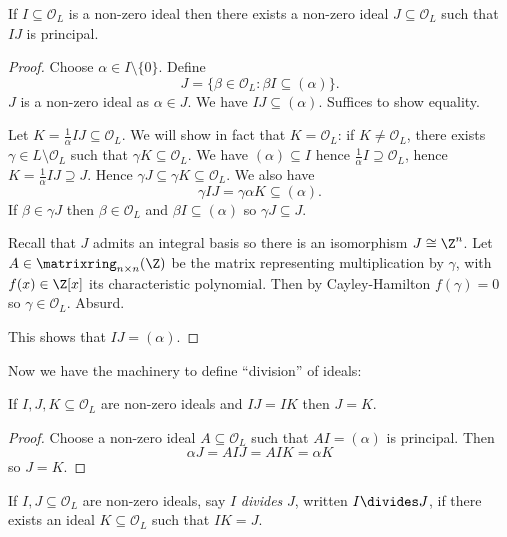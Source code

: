 \documentclass[a4paper]{article}
\renewcommand*{\O}{\mathcal{O}}
\begin{document}
\begin{proposition}
  If \(I \subseteq \O_L\) is a non-zero ideal then there exists a non-zero ideal \(J \subseteq \O_L\) such that \(IJ\) is principal.
\end{proposition}

\begin{proof}
  Choose \(\alpha \in I \setminus \{0\}\). Define
  \[
    J = \{\beta \in \O_L: \beta I \subseteq (\alpha)\}.
  \]
  \(J\) is a non-zero ideal as \(\alpha \in J\). We have \(IJ \subseteq (\alpha)\). Suffices to show equality.

  Let \(K = \frac{1}{\alpha}IJ \subseteq \O_L\). We will show in fact that \(K = \O_L\): if \(K \neq \O_L\), there exists \(\gamma \in L \setminus \O_L\) such that \(\gamma K \subseteq \O_L\). We have \((\alpha) \subseteq I\) hence \(\frac{1}{\alpha} I \supseteq \O_L\), hence \(K = \frac{1}{\alpha}IJ \supseteq J\). Hence \(\gamma J \subseteq \gamma K \subseteq \O_L\). We also have
  \[
    \gamma IJ = \gamma \alpha K \subseteq (\alpha).
  \]
  If \(\beta \in \gamma J\) then \(\beta \in \O_L\) and \(\beta I \subseteq (\alpha)\) so \(\gamma J \subseteq J\).

  Recall that \(J\) admits an integral basis so there is an isomorphism \(J \cong \Z^n\). Let \(A \in \matrixring_{n \times n}(\Z)\) be the matrix representing multiplication by \(\gamma\), with \(f(x) \in \Z[x]\) its characteristic polynomial. Then by Cayley-Hamilton \(f(\gamma) = 0\) so \(\gamma \in \O_L\). Absurd.

  This shows that \(IJ = (\alpha)\).
\end{proof}

Now we have the machinery to define ``division'' of ideals:

\begin{corollary}
  If \(I, J, K \subseteq \O_L\) are non-zero ideals and \(IJ = IK\) then \(J = K\).
\end{corollary}

\begin{proof}
  Choose a non-zero ideal \(A \subseteq \O_L\) such that \(AI = (\alpha)\) is principal. Then
  \[
    \alpha J = AIJ = AIK = \alpha K
  \]
  so \(J = K\).
\end{proof}

\begin{definition}
  If \(I, J \subseteq \O_L\) are non-zero ideals, say \(I\) \emph{divides} \(J\), written \(I \divides J\), if there exists an ideal \(K \subseteq \O_L\) such that \(IK = J\).
\end{definition}
\end{document}
